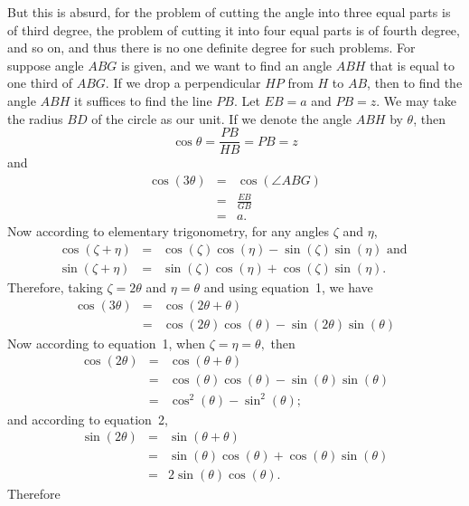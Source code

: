 \documentclass[twoside,openright]{article}
\newlength{\oldjot}
\begin{document}
But this is absurd, for the problem of cutting the angle into three
equal parts is of third degree, the problem of cutting it into four
equal parts is of fourth degree, and so on, and thus there is no one
definite degree for such problems.  For suppose angle $ABG$ is given,
and we want to find an angle $ABH$ that is equal to one third of
$ABG$.  If we drop a perpendicular $HP$ from $H$ to $AB$, then to find
the angle $ABH$ it suffices to find the line $PB$.  Let $EB =a$ and
$PB =z$.  We may take the radius $BD$ of the circle as our unit.  If
we denote the angle $ABH$ by $\theta$, then
$$\cos \theta = \frac{PB}{HB} = PB = z$$
and 
\setlength{\jot}{1.5ex}
\begin{eqnarray*}
  \cos (3\theta) & = & \cos(\angle ABG)\\
                 & = & \frac{EB}{GB}\\
                 & = & a.
\end{eqnarray*}
\setlength{\jot}{\oldjot}
Now according to elementary trigonometry, for any angles $\zeta$ and $\eta$,
\setcounter{equation}{0}
\begin{eqnarray}
  \cos(\zeta + \eta) & = & \cos(\zeta)\cos(\eta) - \sin(\zeta)\sin(\eta) \mbox{ and }\\
  \sin(\zeta + \eta) & = & \sin(\zeta)\cos(\eta) + \cos(\zeta)\sin(\eta).
\end{eqnarray}
Therefore, taking $\zeta = 2 \theta$ and $\eta = \theta$ and using equation~1, we have
\begin{eqnarray*}
  \cos(3\theta) & = & \cos(2\theta + \theta)\\
                & = & \cos(2\theta)\cos(\theta) - \sin(2\theta)\sin(\theta)
\end{eqnarray*}
Now according to equation~1, when $\zeta = \eta = \theta,$ then
\begin{eqnarray*}
  \cos(2\theta) & = &\cos(\theta + \theta) \\
                & = & \cos(\theta)\cos(\theta) - \sin(\theta)\sin(\theta)\\
                & = & \cos^2(\theta) - \sin^2(\theta);
\end{eqnarray*}
and according to equation~2,
\begin{eqnarray*}
  \sin(2\theta)& = & \sin(\theta +\theta)\\
               & = & \sin(\theta)\cos(\theta) + \cos(\theta)\sin(\theta)\\
               & = & 2\sin(\theta)\cos(\theta).
\end{eqnarray*}
Therefore
\end{document}
